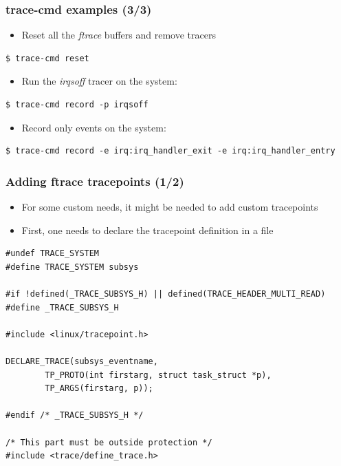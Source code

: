 \begin{frame}[fragile]
  \frametitle{trace-cmd examples (3/3)}
  \begin{itemize}
    \item Reset all the {\em ftrace} buffers and remove tracers
  \end{itemize}
  \begin{block}{}
    \begin{verbatim}
$ trace-cmd reset
    \end{verbatim}
  \end{block}

  \begin{itemize}
    \item Run the {\em irqsoff} tracer on the system:
  \end{itemize}
  \begin{block}{}
    \begin{verbatim}
$ trace-cmd record -p irqsoff
    \end{verbatim}
  \end{block}
  \begin{itemize}
    \item Record only  events on the
          system:
  \end{itemize}
  \begin{block}{}
    \begin{verbatim}
$ trace-cmd record -e irq:irq_handler_exit -e irq:irq_handler_entry
    \end{verbatim}
  \end{block}

\end{frame}

\begin{frame}[fragile]
  \frametitle{Adding ftrace tracepoints (1/2)}
  \begin{itemize}
    \item For some custom needs, it might be needed to add custom tracepoints
    \item First, one needs to declare the tracepoint definition in a 
          file
  \end{itemize}
  \begin{block}{}
    \begin{verbatim}
#undef TRACE_SYSTEM
#define TRACE_SYSTEM subsys

#if !defined(_TRACE_SUBSYS_H) || defined(TRACE_HEADER_MULTI_READ)
#define _TRACE_SUBSYS_H

#include <linux/tracepoint.h>

DECLARE_TRACE(subsys_eventname,
        TP_PROTO(int firstarg, struct task_struct *p),
        TP_ARGS(firstarg, p));

#endif /* _TRACE_SUBSYS_H */

/* This part must be outside protection */
#include <trace/define_trace.h>
    \end{verbatim}
  \end{block}
\end{frame}

